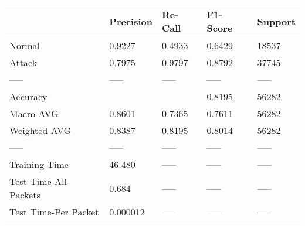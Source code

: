 \begin{tabular}{lllll}
\toprule
{} & Precision & Re-Call & F1-Score & Support \\
\midrule
Normal                &    0.9227 &  0.4933 &   0.6429 &   18537 \\
Attack                &    0.7975 &  0.9797 &   0.8792 &   37745 \\
-----                 &     ----- &   ----- &    ----- &   ----- \\
Accuracy              &           &         &   0.8195 &   56282 \\
Macro AVG             &    0.8601 &  0.7365 &   0.7611 &   56282 \\
Weighted AVG          &    0.8387 &  0.8195 &   0.8014 &   56282 \\
-----                 &     ----- &   ----- &    ----- &   ----- \\
Training Time         &    46.480 &   ----- &    ----- &   ----- \\
Test Time-All Packets &     0.684 &   ----- &    ----- &   ----- \\
Test Time-Per Packet  &  0.000012 &   ----- &    ----- &   ----- \\
\bottomrule
\end{tabular}
